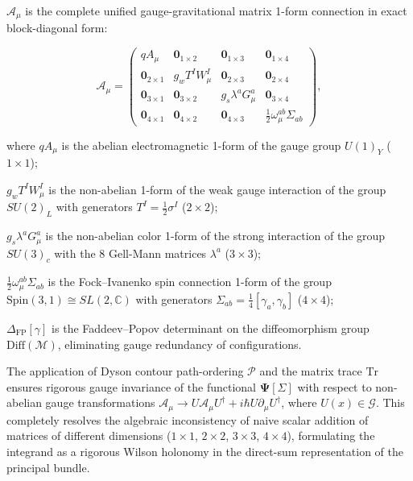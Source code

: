 $\mathbf{\mathcal{A}}_\mu$ is the complete unified gauge-gravitational matrix 1-form connection in exact block-diagonal form:

\begin{equation}\label{eq:1.28}\tag{1.28}
\mathbf{\mathcal{A}}_\mu = \begin{pmatrix} 
q A_\mu & \mathbf{0}_{1\times 2} & \mathbf{0}_{1\times 3} & \mathbf{0}_{1\times 4} \\ 
\mathbf{0}_{2\times 1} & g_w T^I W_\mu^I & \mathbf{0}_{2\times 3} & \mathbf{0}_{2\times 4} \\ 
\mathbf{0}_{3\times 1} & \mathbf{0}_{3\times 2} & g_s \lambda^a G_\mu^a & \mathbf{0}_{3\times 4} \\ 
\mathbf{0}_{4\times 1} & \mathbf{0}_{4\times 2} & \mathbf{0}_{4\times 3} & \frac{1}{2}\omega_\mu^{ab}\Sigma_{ab} 
\end{pmatrix},
\end{equation}

where $q A_\mu$ is the abelian electromagnetic 1-form of the gauge group $U(1)_Y$ ($1 \times 1$);  

$g_w T^I W_\mu^I$ is the non-abelian 1-form of the weak gauge interaction of the group $SU(2)_L$ with generators $T^I = \frac{1}{2}\sigma^I$ ($2 \times 2$);  

$g_s \lambda^a G_\mu^a$ is the non-abelian color 1-form of the strong interaction of the group $SU(3)_c$ with the 8 Gell-Mann matrices $\lambda^a$ ($3 \times 3$);  

$\frac{1}{2}\omega_\mu^{ab}\Sigma_{ab}$ is the Fock--Ivanenko spin connection 1-form of the group $\text{Spin}(3,1) \cong SL(2, \mathbb{C})$ with generators $\Sigma_{ab} = \frac{1}{4}[\gamma_a, \gamma_b]$ ($4 \times 4$);  

$\Delta_{\text{FP}}[\gamma]$ is the Faddeev--Popov determinant on the diffeomorphism group $\text{Diff}(\mathcal{M})$, eliminating gauge redundancy of configurations.

The application of Dyson contour path-ordering $\mathcal{P}$ and the matrix trace $\text{Tr}$ ensures rigorous gauge invariance of the functional $\mathbf{\Psi}[\Sigma]$ with respect to non-abelian gauge transformations $\mathbf{\mathcal{A}}_\mu \to U \mathbf{\mathcal{A}}_\mu U^\dagger + i\hbar U \partial_\mu U^\dagger$, where $U(x) \in \mathcal{G}$. This completely resolves the algebraic inconsistency of naive scalar addition of matrices of different dimensions ($1\times 1$, $2\times 2$, $3\times 3$, $4\times 4$), formulating the integrand as a rigorous Wilson holonomy in the direct-sum representation of the principal bundle.

